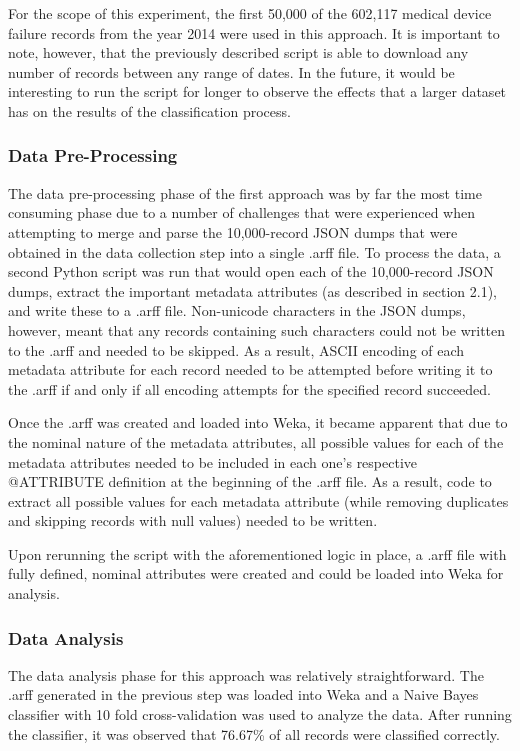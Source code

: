 \documentclass[11pt, notitlepage,abstracton,oneside]{article}   	%
\begin{document}
For the scope of this experiment, the first 50,000 of the 602,117 medical device failure records from the year 2014 were used in this approach. It is important to note, however, that the previously described script is able to download any number of records between any range of dates. In the future, it would be interesting to run the script for longer to observe the effects that a larger dataset has on the results of the classification process.

\subsubsection{Data Pre-Processing}
The data pre-processing phase of the first approach was by far the most time consuming phase due to a number of challenges that were experienced when attempting to merge and parse the 10,000-record JSON dumps that were obtained in the data collection step into a single .arff file. To process the data, a second Python script was run that would open each of the 10,000-record JSON dumps, extract the important metadata attributes (as described in section 2.1), and write these to a .arff file. Non-unicode characters in the JSON dumps, however, meant that any records containing such characters could not be written to the .arff and needed to be skipped. As a result, ASCII encoding of each metadata attribute for each record needed to be attempted before writing it to the .arff if and only if all encoding attempts for the specified record succeeded.

Once the .arff was created and loaded into Weka, it became apparent that due to the nominal nature of the metadata attributes, all possible values for each of the metadata attributes needed to be included in each one's respective @ATTRIBUTE definition at the beginning of the .arff file. As a result, code to extract all possible values for each metadata attribute (while removing duplicates and skipping records with null values) needed to be written. 

Upon rerunning the script with the aforementioned logic in place, a .arff file with fully defined, nominal attributes were created and could be loaded into Weka for analysis. 

\subsubsection{Data Analysis}
The data analysis phase for this approach was relatively straightforward. The .arff generated in the previous step was loaded into Weka and a Naive Bayes classifier with 10 fold cross-validation was used to analyze the data. After running the classifier, it was observed that 76.67\% of all records were classified correctly.
\end{document}
